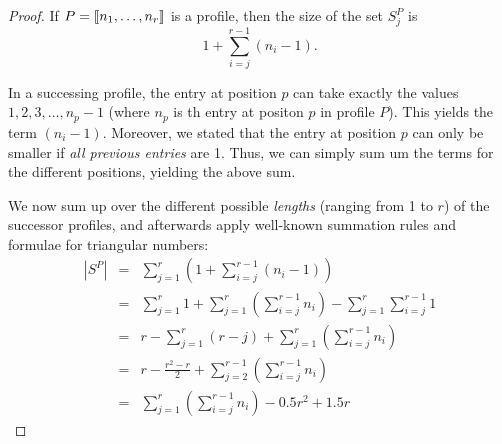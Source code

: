 \begin{proof}
  If $P=\left\llbracket n_1,\dots,n_r \right\rrbracket$ is a profile, then the size of the set $S^P_j$ is
  \begin{equation*}
    1+ \sum_{i=j}^{r-1} (n_i-1).
  \end{equation*}
  
  In a successing profile, the entry at position $p$ can take exactly the values $1, 2, 3, \dots, n_p-1$ (where $n_p$ is th entry at positon $p$ in profile $P$). This yields the term $(n_i-1)$. Moreover, we stated that the entry at position $p$ can only be smaller if \emph{all previous entries} are 1. Thus, we can simply sum um the terms for the different positions, yielding the above sum.

  We now sum up over the different possible \emph{lengths} (ranging from 1 to $r$) of the successor profiles, and afterwards apply well-known summation rules and formulae for triangular numbers:
  \begin{eqnarray*}
    \left| S^P \right| & = & \sum_{j=1}^{r} \left( 1+ \sum_{i=j}^{r-1} (n_i-1) \right) \\
    &=& \sum_{j=1}^{r} 1 + \sum_{j=1}^{r} \left( \sum_{i=j}^{r-1} n_i \right) - \sum_{j=1}^{r}\sum_{i=j}^{r-1} 1 \\
    &=&r - \sum_{j=1}^{r}(r-j) + \sum_{j=1}^{r} \left( \sum_{i=j}^{r-1} n_i \right) \\
    &=&r - \frac{r^2-r}{2} + \sum_{j=2}^{r-1} \left( \sum_{i=j}^{r-1} n_i \right) \\
    &=&\sum _{j=1}^{r} \left( \sum _{i=j}^{r-1}n_{{i}} \right) -0.5r^2 + 1.5 r
  \end{eqnarray*}


\end{proof}
